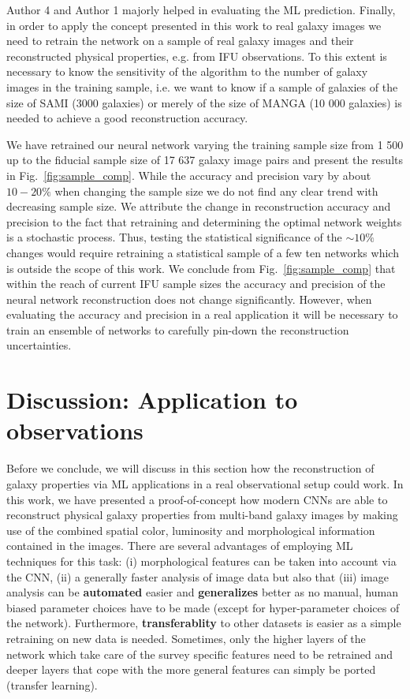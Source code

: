 \documentclass[conference]{IEEEtran}
\begin{document}
Author 4 and Author 1 majorly helped in evaluating the ML prediction. Finally, in order to apply the concept presented in this work to real galaxy images we need to retrain the network on a sample of real galaxy images and their reconstructed physical properties, e.g. from IFU observations. To this extent is necessary to know the sensitivity of the algorithm to the number of galaxy images in the training sample, i.e. we want to know if a sample of galaxies of the size of SAMI (3000 galaxies) or merely of the size of MANGA (10 000 galaxies) is needed to achieve a good reconstruction accuracy.

We have retrained our neural network varying the training sample size from 1 500 up to the fiducial sample size of 17 637 galaxy image pairs and present the results in Fig.~\ref{fig:sample_comp}. While the accuracy and precision vary by about $10-20\%$ when changing the sample size we do not find any clear trend with decreasing sample size. We attribute the change in reconstruction accuracy and precision to the fact that retraining and determining the optimal network weights is a stochastic process. Thus, testing the statistical significance of the $\sim10\%$ changes would require retraining a statistical sample of a few ten networks which is outside the scope of this work.
We conclude from Fig.~\ref{fig:sample_comp} that within the reach of current IFU sample sizes the accuracy and precision of the neural network reconstruction does not change significantly. However, when evaluating the accuracy and precision in a real application it will be necessary to train an ensemble of networks to carefully pin-down the reconstruction uncertainties.


\section{Discussion: Application to observations}
\label{sec:disc}

Before we conclude, we will discuss in this section how the reconstruction of galaxy properties via ML applications in a real observational setup could work.
In this work, we have presented a proof-of-concept how modern CNNs are able to reconstruct physical galaxy properties from multi-band galaxy images by making use of the combined spatial color, luminosity and morphological information contained in the images. There are several advantages of employing ML techniques for this task: (i) morphological features can be taken into account via the CNN, (ii) a generally faster analysis of image data but also that (iii) image analysis can be \textbf{automated} easier and \textbf{generalizes} better as no manual, human biased parameter choices have to be made (except for hyper-parameter choices of the network). Furthermore, \textbf{transferablity} to other datasets is easier as a simple retraining on new data is needed. Sometimes, only the higher layers of the network which take care of the survey specific features need to be retrained and deeper layers that cope with the more general features can simply be ported (transfer learning).
\end{document}
